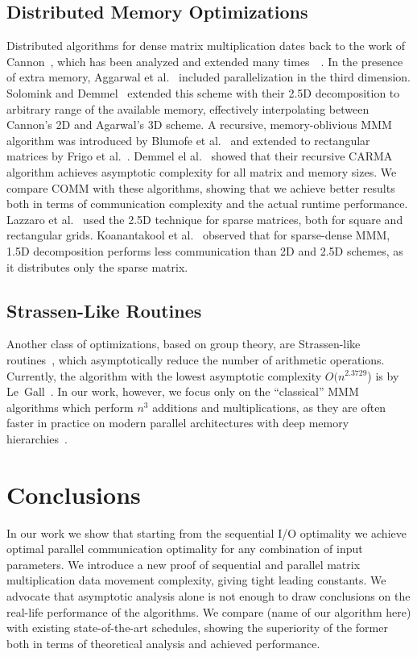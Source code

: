 \documentclass[sigplan,review,anonymous,10pt]{acmart}\settopmatter{printfolios=true,printccs=false,printacmref=false}
\begin{document}
\subsection{Distributed Memory Optimizations}
Distributed algorithms for dense matrix multiplication dates back to the work 
of 
Cannon~\cite{Cannon}, which has been analyzed and extended many 
times~\cite{MManalysis}~\cite{generalCannon}. In the presence of extra memory, 
Aggarwal et al.~\cite{summa3d} included parallelization in the third dimension. 
Solomink and Demmel~\cite{25d} extended this scheme with their 2.5D 
decomposition to arbitrary range of 
the available memory, effectively interpolating between Cannon's 2D and 
Agarwal's 
3D scheme. A recursive, memory-oblivious 
MMM algorithm was introduced by 
Blumofe 
et al.~\cite{recursiveMM} and extended to rectangular matrices by Frigo et 
al.~\cite{recursiveRectangularMM}. Demmel el al.~\cite{CARMA} showed that their 
recursive CARMA algorithm achieves asymptotic complexity for all matrix and 
memory sizes. We compare COMM with these algorithms, showing that we achieve 
better results both in terms of communication complexity and the actual runtime
performance. 
Lazzaro et al.~\cite{lazzaroSpMM} used the 2.5D technique for sparse 
matrices, both for square and rectangular grids. Koanantakool et 
al.~\cite{sparse15D} observed that for sparse-dense MMM, 1.5D decomposition 
performs less communication than 2D and 2.5D schemes, as it distributes only 
the sparse matrix.

\subsection{Strassen-Like Routines}

Another class of optimizations, based on group theory,
are Strassen-like routines~\cite{Strassen}, which asymptotically reduce the
number of arithmetic operations. Currently, the algorithm with the lowest
asymptotic complexity $O(n^{2.3729}$) is by Le~Gall~\cite{LeGall}. In our work,
however, we focus only on the ``classical'' MMM algorithms which perform $n^3$
additions and multiplications, as they are often faster in practice on modern 
parallel architectures with deep memory hierarchies~\cite{strassenVsClassic}.  



\section{Conclusions}
In our work we show that starting from the sequential I/O optimality we achieve 
optimal parallel communication optimality for any combination of input 
parameters. We introduce a new proof of sequential and parallel matrix 
multiplication data movement complexity, giving tight leading constants. We 
advocate that asymptotic analysis alone is not enough to draw conclusions on 
the real-life performance of the algorithms. We 
compare (name of our algorithm here) with existing state-of-the-art schedules, 
showing the 
superiority of the former both in terms of theoretical analysis and achieved 
performance.
\end{document}
